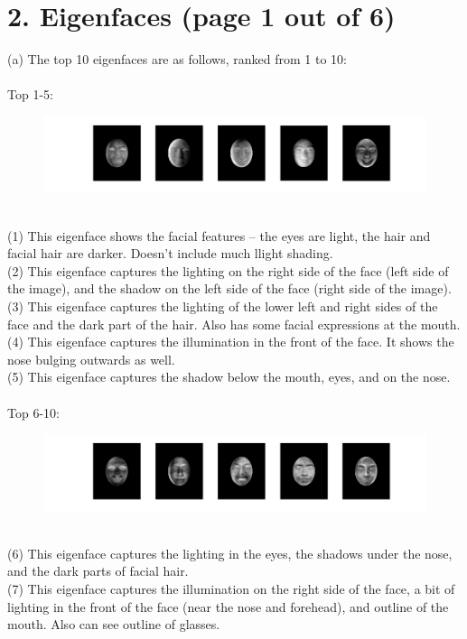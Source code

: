 \documentclass[11pt]{article}
\begin{document}
\section*{2. Eigenfaces (page 1 out of 6)}
(a) The top 10 eigenfaces are as follows, ranked from 1 to 10:
\\\\
Top 1-5:
\begin{figure}[ht!]
\centering
\includegraphics[width=180mm]{images/eigface5-1.png}
\label{overflow}
\end{figure}
\\
(1) This eigenface shows the facial features -- the eyes are light, the hair and facial hair are darker. Doesn't include much llight shading. \\
(2) This eigenface captures the lighting on the right side of the face (left side of the image), and the shadow on the left side of the face (right side of the image). \\
(3) This eigenface captures the lighting of the lower left and right sides of the face and the dark part of the hair. Also has some facial expressions at the mouth. \\
(4) This eigenface captures the illumination in the front of the face. It shows the nose bulging outwards as well. \\
(5) This eigenface captures the shadow below the mouth, eyes, and on the nose.
\\\\
Top 6-10:
\begin{figure}[ht!]
\centering
\includegraphics[width=180mm]{images/eigface5-2.png}
\label{overflow}
\end{figure}
\\
(6) This eigenface captures the lighting in the eyes, the shadows under the nose, and the dark parts of facial hair. \\
(7) This eigenface captures the illumination on the right side of the face, a bit of lighting in the front of the face (near the nose and forehead), and outline of the mouth. Also can see outline of glasses. \\
\end{document}
